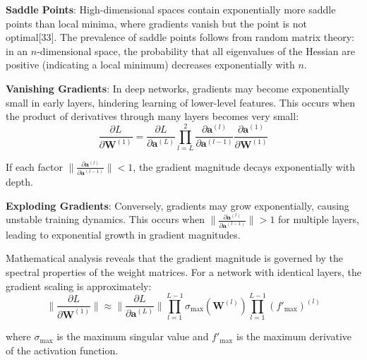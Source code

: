 \documentclass[11pt,a4paper]{report}
\begin{document}
\textbf{Saddle Points}: High-dimensional spaces contain exponentially more saddle points than local minima, where gradients vanish but the point is not optimal[33]. The prevalence of saddle points follows from random matrix theory: in an $n$-dimensional space, the probability that all eigenvalues of the Hessian are positive (indicating a local minimum) decreases exponentially with $n$.

\textbf{Vanishing Gradients}: In deep networks, gradients may become exponentially small in early layers, hindering learning of lower-level features. This occurs when the product of derivatives through many layers becomes very small:
\begin{equation}
\frac{\partial L}{\partial \mathbf{W}^{(1)}} = \frac{\partial L}{\partial \mathbf{a}^{(L)}} \prod_{l=L}^{2} \frac{\partial \mathbf{a}^{(l)}}{\partial \mathbf{a}^{(l-1)}} \frac{\partial \mathbf{a}^{(1)}}{\partial \mathbf{W}^{(1)}}
\end{equation}

If each factor $\|\frac{\partial \mathbf{a}^{(l)}}{\partial \mathbf{a}^{(l-1)}}\| < 1$, the gradient magnitude decays exponentially with depth.

\textbf{Exploding Gradients}: Conversely, gradients may grow exponentially, causing unstable training dynamics. This occurs when $\|\frac{\partial \mathbf{a}^{(l)}}{\partial \mathbf{a}^{(l-1)}}\| > 1$ for multiple layers, leading to exponential growth in gradient magnitudes.

Mathematical analysis reveals that the gradient magnitude is governed by the spectral properties of the weight matrices. For a network with identical layers, the gradient scaling is approximately:
\begin{equation}
\|\frac{\partial L}{\partial \mathbf{W}^{(1)}}\| \approx \|\frac{\partial L}{\partial \mathbf{a}^{(L)}}\| \prod_{l=1}^{L-1} \sigma_{\max}(\mathbf{W}^{(l)}) \prod_{l=1}^{L-1} \left(f'_{\max}\right)^{(l)}
\end{equation}

where $\sigma_{\max}$ is the maximum singular value and $f'_{\max}$ is the maximum derivative of the activation function.
\end{document}
